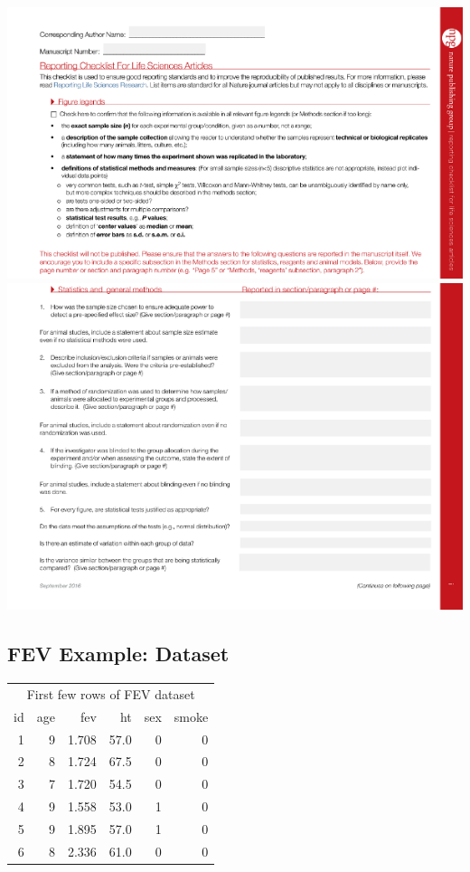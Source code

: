 \documentclass[
]{book}
\begin{document}
\includegraphics[width=1\linewidth]{./1_55}
\includegraphics[width=1\linewidth]{./1_56}

\hypertarget{fev-example-dataset}{%
\subsection{FEV Example: Dataset}\label{fev-example-dataset}}

\begin{table}
\centering
\begin{tabular}{r|r|r|r|r|r}
\hline
\multicolumn{6}{c}{First few rows of FEV dataset} \\
\cline{1-6}
id & age & fev & ht & sex & smoke\\
\hline
1 & 9 & 1.708 & 57.0 & 0 & 0\\
\hline
2 & 8 & 1.724 & 67.5 & 0 & 0\\
\hline
3 & 7 & 1.720 & 54.5 & 0 & 0\\
\hline
4 & 9 & 1.558 & 53.0 & 1 & 0\\
\hline
5 & 9 & 1.895 & 57.0 & 1 & 0\\
\hline
6 & 8 & 2.336 & 61.0 & 0 & 0\\
\hline
\end{tabular}
\end{table}
\end{document}
